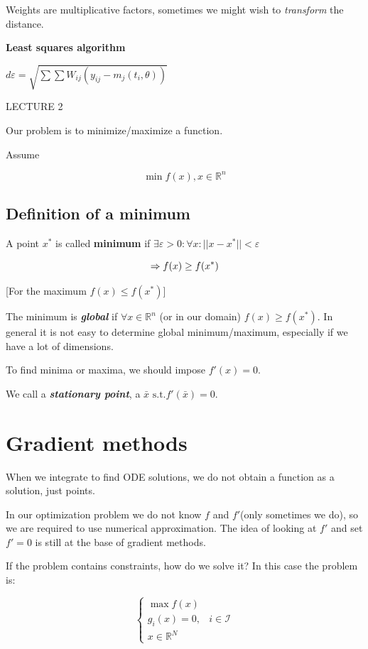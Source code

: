 Weights are multiplicative factors, sometimes we might wish to
\emph{transform} the distance.

\textbf{Least squares algorithm}

$d{\varepsilon}=\sqrt{\sum \sum W_{ij}\left(y_{ij}-m_j\left(t_i, \theta\right)\right)}$

LECTURE 2

Our problem is to minimize/maximize a function.

Assume

$$
\min f(x), x \in \mathbb{R}^n
$$

\hypertarget{definition-of-a-minimum}{%
\subsection{Definition of a minimum}\label{definition-of-a-minimum}}

A point $x^*$ is called \textbf{minimum} if
$\exists \varepsilon > 0 : \forall x : || x- x^* || < \varepsilon$

$$
\Rightarrow f(x) \geq f(x^*) \\ 
$$

{[}For the maximum $f(x) \leq f(x^*)${]}

The minimum is \textbf{\emph{global}} if $\forall x \in \mathbb{R}^n$
(or in our domain) $f(x) \geq f(x^*)$. In general it is not easy to
determine global minimum/maximum, especially if we have a lot of
dimensions.

To find minima or maxima, we should impose $f'(x)=0$.

We call a \textbf{\emph{stationary point}}, a
$\bar{x} \text{ s.t.} f'(\bar{x})=0$.

\hypertarget{gradient-methods}{%
\section{Gradient methods}\label{gradient-methods}}

When we integrate to find ODE solutions, we do not obtain a function as
a solution, just points.

In our optimization problem we do not know $f$ and $f'$(only sometimes
we do), so we are required to use numerical approximation. The idea of
looking at $f'$ and set $f'=0$ is still at the base of gradient methods.

If the problem contains constraints, how do we solve it? In this case
the problem is:

$$\left\{\begin{array}{ll}
\max f(x) &  \\
g_i(x)=0, & i \in \mathcal{I} \\
x \in \mathbb{R}^N
\end{array}\right.$$

